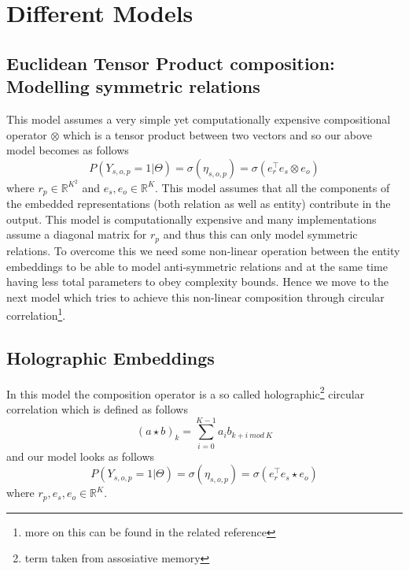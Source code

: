 \documentclass[12pt]{article}
\begin{document}
\section{Different Models}
\subsection{Euclidean Tensor Product composition: Modelling symmetric relations}
This model assumes a very simple yet computationally expensive compositional operator $\otimes$ which is a tensor product between two vectors and so our above model becomes as follows 
\begin{equation}
P(Y_{s, o, p}=1 | \Theta) = \sigma(\eta_{s, o, p}) = \sigma(e_{r}^{\intercal}e_{s}\otimes e_{o})
\end{equation} where $r_{p} \in \mathbb{R}^{K^2}$ and $e_{s}, e_{o} \in \mathbb{R}^{K}$. This model assumes that all the components of the embedded representations (both relation as well as entity) contribute in the output. This model is computationally expensive and many implementations assume a diagonal matrix for $r_{p}$ and thus this can only model symmetric relations. To overcome this we need some non-linear operation between the entity embeddings to be able to model anti-symmetric relations and at the same time having less total parameters to obey complexity bounds. Hence we move to the next model which tries to achieve this non-linear composition through circular correlation\footnote{more on this can be found in the related reference}.
\subsection{Holographic Embeddings}
In this model the composition operator is a so called holographic\footnote{term taken from assosiative memory} circular correlation which is defined as follows
\begin{equation}
(a \star b)_{k} = \sum_{i=0}^{K-1}a_{i}b_{k+i\ mod\ K}
\end{equation} and our model looks as follows
\begin{equation}
P(Y_{s, o, p}=1 | \Theta) = \sigma(\eta_{s, o, p}) = \sigma(e_{r}^{\intercal}e_{s}\star e_{o})
\end{equation} where $r_{p}, e_{s}, e_{o} \in \mathbb{R}^{K}$.
\end{document}
